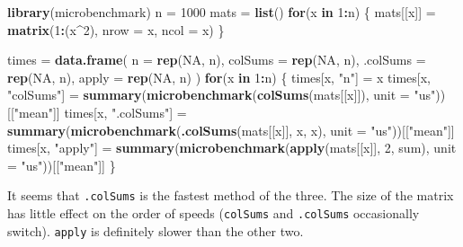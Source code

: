 \documentclass[
]{article}
\newenvironment{Shaded}{\begin{snugshade}}{\end{snugshade}}
\newcommand{\ControlFlowTok}[1]{\textcolor[rgb]{0.13,0.29,0.53}{\textbf{#1}}}
\newcommand{\DataTypeTok}[1]{\textcolor[rgb]{0.13,0.29,0.53}{#1}}
\newcommand{\DecValTok}[1]{\textcolor[rgb]{0.00,0.00,0.81}{#1}}
\newcommand{\KeywordTok}[1]{\textcolor[rgb]{0.13,0.29,0.53}{\textbf{#1}}}
\newcommand{\NormalTok}[1]{#1}
\newcommand{\OperatorTok}[1]{\textcolor[rgb]{0.81,0.36,0.00}{\textbf{#1}}}
\newcommand{\OtherTok}[1]{\textcolor[rgb]{0.56,0.35,0.01}{#1}}
\newcommand{\StringTok}[1]{\textcolor[rgb]{0.31,0.60,0.02}{#1}}
\begin{document}
\begin{Shaded}
\begin{Highlighting}[]
\KeywordTok{library}\NormalTok{(microbenchmark)}
\NormalTok{n =}\StringTok{ }\DecValTok{1000}
\NormalTok{mats =}\StringTok{ }\KeywordTok{list}\NormalTok{()}
\ControlFlowTok{for}\NormalTok{(x }\ControlFlowTok{in} \DecValTok{1}\OperatorTok{:}\NormalTok{n) \{}
\NormalTok{    mats[[x]] =}\StringTok{ }\KeywordTok{matrix}\NormalTok{(}\DecValTok{1}\OperatorTok{:}\NormalTok{(x}\OperatorTok{\^{}}\DecValTok{2}\NormalTok{), }\DataTypeTok{nrow =}\NormalTok{ x, }\DataTypeTok{ncol =}\NormalTok{ x)}
\NormalTok{\}}

\NormalTok{times =}\StringTok{ }\KeywordTok{data.frame}\NormalTok{(}
    \DataTypeTok{n =} \KeywordTok{rep}\NormalTok{(}\OtherTok{NA}\NormalTok{, n),}
    \DataTypeTok{colSums =} \KeywordTok{rep}\NormalTok{(}\OtherTok{NA}\NormalTok{, n),}
    \DataTypeTok{.colSums =} \KeywordTok{rep}\NormalTok{(}\OtherTok{NA}\NormalTok{, n),}
    \DataTypeTok{apply =} \KeywordTok{rep}\NormalTok{(}\OtherTok{NA}\NormalTok{, n)}
\NormalTok{)}
\ControlFlowTok{for}\NormalTok{(x }\ControlFlowTok{in} \DecValTok{1}\OperatorTok{:}\NormalTok{n) \{}
\NormalTok{    times[x, }\StringTok{"n"}\NormalTok{] =}\StringTok{ }\NormalTok{x}
\NormalTok{    times[x, }\StringTok{"colSums"}\NormalTok{] =}\StringTok{ }\KeywordTok{summary}\NormalTok{(}\KeywordTok{microbenchmark}\NormalTok{(}\KeywordTok{colSums}\NormalTok{(mats[[x]]), }\DataTypeTok{unit =} \StringTok{"us"}\NormalTok{))[[}\StringTok{"mean"}\NormalTok{]]}
\NormalTok{    times[x, }\StringTok{".colSums"}\NormalTok{] =}\StringTok{ }\KeywordTok{summary}\NormalTok{(}\KeywordTok{microbenchmark}\NormalTok{(}\KeywordTok{.colSums}\NormalTok{(mats[[x]], x, x), }\DataTypeTok{unit =} \StringTok{"us"}\NormalTok{))[[}\StringTok{"mean"}\NormalTok{]]}
\NormalTok{    times[x, }\StringTok{"apply"}\NormalTok{] =}\StringTok{ }\KeywordTok{summary}\NormalTok{(}\KeywordTok{microbenchmark}\NormalTok{(}\KeywordTok{apply}\NormalTok{(mats[[x]], }\DecValTok{2}\NormalTok{, sum), }\DataTypeTok{unit =} \StringTok{"us"}\NormalTok{))[[}\StringTok{"mean"}\NormalTok{]]}
\NormalTok{\}}
\end{Highlighting}
\end{Shaded}

It seems that \texttt{.colSums} is the fastest method of the three. The
size of the matrix has little effect on the order of speeds
(\texttt{colSums} and \texttt{.colSums} occasionally switch).
\texttt{apply} is definitely slower than the other two.
\end{document}
